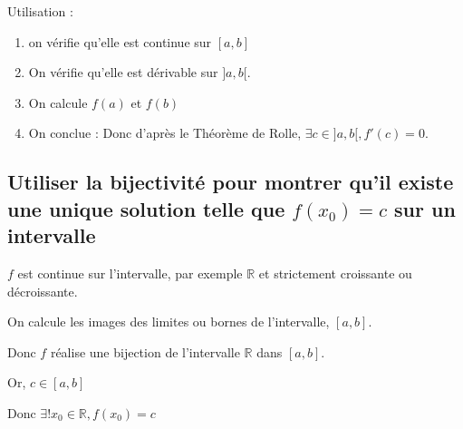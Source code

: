 \documentclass[french]{yLectureNote}
\begin{document}
Utilisation :

\begin{enumerate}
 \item on vérifie qu'elle est continue sur $[a,b]$
 \item On vérifie qu'elle est dérivable sur $]a,b[$.
 \item On calcule $f(a)$ et $f(b)$
\item On conclue : Donc d'après le Théorème de Rolle, $\exists c\in]a,b[, f'(c)=0$.
\end{enumerate}
\subsection{Utiliser la bijectivité pour montrer qu'il existe une unique solution telle que $f(x_0) = c$ sur un intervalle}
$f$ est continue sur l'intervalle, par exemple $\mathbb{R}$ et strictement croissante ou décroissante.

On calcule les images des limites ou bornes de l'intervalle, $[a,b]$.

Donc $f$ réalise une bijection de l'intervalle $\mathbb{R}$ dans  $[a,b]$.

Or, $c\in[a,b]$

Donc $\exists! x_0\in \mathbb{R}, f(x_0) = c$
\end{document}
